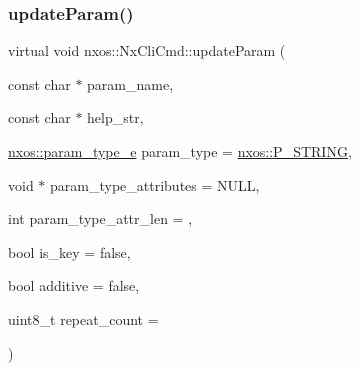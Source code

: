 \subsubsection{\texorpdfstring{update\+Param()}{updateParam()}}
{\footnotesize\ttfamily virtual void nxos\+::\+Nx\+Cli\+Cmd\+::update\+Param (\begin{DoxyParamCaption}\item[{const char $\ast$}]{param\+\_\+name,  }\item[{const char $\ast$}]{help\+\_\+str,  }\item[{\mbox{\hyperlink{namespacenxos_ad220d5ba6a2a5d7edeab55cb89d309ea}{nxos\+::param\+\_\+type\+\_\+e}}}]{param\+\_\+type = {\ttfamily \mbox{\hyperlink{namespacenxos_ad220d5ba6a2a5d7edeab55cb89d309eaa351d79231fdcee1f39ac930bf6cc56ea}{nxos\+::\+P\+\_\+\+S\+T\+R\+I\+NG}}},  }\item[{void $\ast$}]{param\+\_\+type\+\_\+attributes = {\ttfamily NULL},  }\item[{int}]{param\+\_\+type\+\_\+attr\+\_\+len = {},  }\item[{bool}]{is\+\_\+key = {\ttfamily false},  }\item[{bool}]{additive = {\ttfamily false},  }\item[{uint8\+\_\+t}]{repeat\+\_\+count = {} }\end{DoxyParamCaption})\hspace{0.3cm}{\ttfamily [pure virtual]}}

